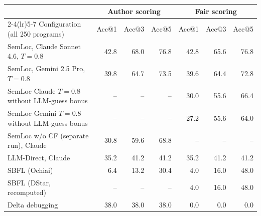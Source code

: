 \begin{tabular}{lrrrrrr}
\toprule
 & \multicolumn{3}{c}{Author scoring} & \multicolumn{3}{c}{Fair scoring} \\
\cmidrule(lr){2-4}\cmidrule(lr){5-7}
Configuration (all 250 programs) & Acc@1 & Acc@3 & Acc@5 & Acc@1 & Acc@3 & Acc@5 \\
\midrule
SemLoc, Claude Sonnet 4.6, $T{=}0.8$ & 42.8 & 68.0 & 76.8 & 42.8 & 65.6 & 76.8 \\
SemLoc, Gemini 2.5 Pro, $T{=}0.8$ & 39.8 & 64.7 & 73.5 & 39.6 & 64.4 & 72.8 \\
SemLoc Claude $T{=}0.8$ without LLM-guess bonus & -- & -- & -- & 30.0 & 55.6 & 66.4 \\
SemLoc Gemini $T{=}0.8$ without LLM-guess bonus & -- & -- & -- & 27.2 & 55.6 & 64.0 \\
SemLoc w/o CF (separate run), Claude & 30.8 & 59.6 & 68.8 & -- & -- & -- \\
LLM-Direct, Claude & 35.2 & 41.2 & 41.2 & 35.2 & 41.2 & 41.2 \\
SBFL (Ochiai) & 6.4 & 13.2 & 30.4 & 4.0 & 16.0 & 48.0 \\
SBFL (DStar, recomputed) & -- & -- & -- & 4.0 & 16.0 & 48.0 \\
Delta debugging & 38.0 & 38.0 & 38.0 & 0.0 & 0.0 & 0.0 \\
\bottomrule
\end{tabular}
